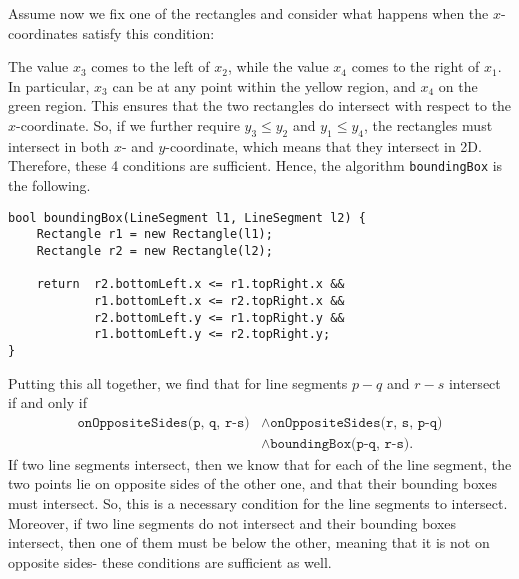 \documentclass[a4paper, openany]{memoir}
\begin{document}
Assume now we fix one of the rectangles and consider what happens when the $x$-coordinates satisfy this condition:
\begin{figure}[H]
    \centering
\end{figure}
\noindent The value $x_3$ comes to the left of $x_2$, while the value $x_4$ comes to the right of $x_1$. In particular, $x_3$ can be at any point within the yellow region, and $x_4$ on the green region. This ensures that the two rectangles do intersect with respect to the $x$-coordinate. So, if we further require $y_3 \leq y_2$ and $y_1 \leq y_4$, the rectangles must intersect in both $x$- and $y$-coordinate, which means that they intersect in 2D. Therefore, these 4 conditions are sufficient. Hence, the algorithm \texttt{boundingBox} is the following.
\begin{lstlisting}[language=pseudocode]
bool boundingBox(LineSegment l1, LineSegment l2) {
    Rectangle r1 = new Rectangle(l1);
    Rectangle r2 = new Rectangle(l2);

    return  r2.bottomLeft.x <= r1.topRight.x &&
            r1.bottomLeft.x <= r2.topRight.x &&
            r2.bottomLeft.y <= r1.topRight.y &&
            r1.bottomLeft.y <= r2.topRight.y;
}
\end{lstlisting}

Putting this all together, we find that for line segments $p-q$ and $r-s$ intersect if and only if 
\begin{align*}
    \texttt{onOppositeSides(p, q, r-s)} &\land \texttt{onOppositeSides(r, s, p-q)} \\
    &\land \texttt{boundingBox(p-q, r-s)}.
\end{align*}
If two line segments intersect, then we know that for each of the line segment, the two points lie on opposite sides of the other one, and that their bounding boxes must intersect. So, this is a necessary condition for the line segments to intersect. Moreover, if two line segments do not intersect and their bounding boxes intersect, then one of them must be below the other, meaning that it is not on opposite sides- these conditions are sufficient as well.
\end{document}
